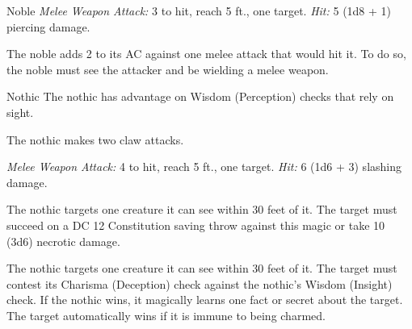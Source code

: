 \documentclass[10pt,a4paper,twoside,bg=print,twocolumn,openany,nodeprecatedcode]{dndbook}
\begin{document}
\begin{DndMonster}[float=t]{Noble}
\DndMonsterBasics[
armor-class = {15 (\textit{breastplate})},
hit-points = {\DndDice{2d8}},
speed = {30 ft.}
]
\DndMonsterAbilityScores[
 str = 11,
 dex = 12,
 con = 11,
 int = 12,
 wis = 14,
 cha = 16
]
\DndMonsterDetails[
skills = {Deception +5, Insight +4, Persuasion +5},
languages = {any two languages},
challenge = 1/8,
]
\textsl{Melee Weapon Attack:} 3 to hit, reach 5 ft., one target. \textsl{Hit:} 5 (1d8 + 1) piercing damage.

The noble adds 2 to its AC against one melee attack that would hit it. To do so, the noble must see the attacker and be wielding a melee weapon.

\end{DndMonster}


\clearpage

\begin{DndMonster}[float=t]{Nothic}
\DndMonsterBasics[
armor-class = {15 (natural armor)},
hit-points = {\DndDice{6d8 + 18}},
speed = {30 ft.}
]
\DndMonsterAbilityScores[
 str = 14,
 dex = 16,
 con = 16,
 int = 13,
 wis = 10,
 cha = 8
]
\DndMonsterDetails[
skills = {Arcana +3, Insight +4, Perception +2, Stealth +5},
senses = {truesight 120 ft., passive perception 12},
languages = {Undercommon},
challenge = 2,
]
The nothic has advantage on Wisdom (Perception) checks that rely on sight.

The nothic makes two claw attacks.

\textsl{Melee Weapon Attack:} 4 to hit, reach 5 ft., one target. \textsl{Hit:} 6 (1d6 + 3) slashing damage.

The nothic targets one creature it can see within 30 feet of it. The target must succeed on a DC 12 Constitution saving throw against this magic or take 10 (3d6) necrotic damage.

The nothic targets one creature it can see within 30 feet of it. The target must contest its Charisma (Deception) check against the nothic's Wisdom (Insight) check. If the nothic wins, it magically learns one fact or secret about the target. The target automatically wins if it is immune to being charmed.

\end{DndMonster}
\end{document}
